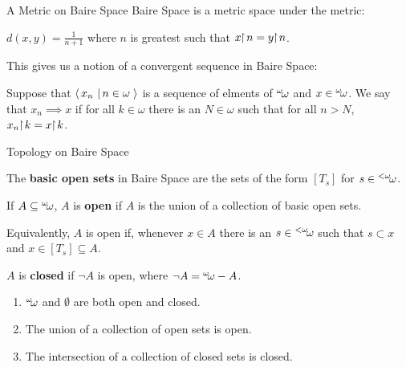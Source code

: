 \documentclass[pdf,final]{prosper}
\newcommand{\skipsmall}{\vspace{1em}}
\begin{document}
\begin{slide}{A Metric on Baire Space}
Baire Space is a metric space under the metric:

\skipsmall

$d(x,y) = \frac{1}{n+1}$ where $n$ is greatest such that $x\!\!\upharpoonright\! n = y\!\!\upharpoonright\! n$.

\skipsmall

This gives us a notion of a convergent sequence in Baire Space:

\skipsmall
Suppose that $\left\langle \, x_n \,\left| \, n\in\omega \, \right. \right\rangle$ is a sequence of elments of
${}^{\omega}\!{\omega}$ and $x\in{}^{\omega}\!{\omega}$. We say that $x_n\implies x$ if for all $k\in\omega$
there is an $N\in\omega$ such that for all $n>N$, $x_n\!\!\upharpoonright\! k = x\!\!\upharpoonright\! k$.


\end{slide}

\begin{slide}{Topology on Baire Space}
\begin{definition}
The \textbf{basic open sets} in Baire Space are the sets of the form $[T_s]$ for
$s\in{}^{<\omega}\!{\omega}$. 

\skipsmall

If $A\subseteq{}^{\omega}\!{\omega}$, $A$ is \textbf{open} if $A$ is the union of a
collection of basic open sets. 

\skipsmall

Equivalently, $A$ is open if, whenever $x\in A$
there is an $s\in{}^{<\omega}\!{\omega}$ such that $s\subset x$  and
$x\in[T_s]\subseteq A$.

\skipsmall
 $A$ is
\textbf{closed} if $\neg A$ is open, where $\neg A = {}^{\omega}\!{\omega} - A$.
\end{definition}

\skipsmall

\begin{enumerate}
  \item ${}^{\omega}\!{\omega}$ and $\emptyset$ are both open and closed.
  \item The union of a collection of open sets is open.
  \item The intersection of a collection of closed sets is closed.
\end{enumerate}

\end{slide}
\end{document}
